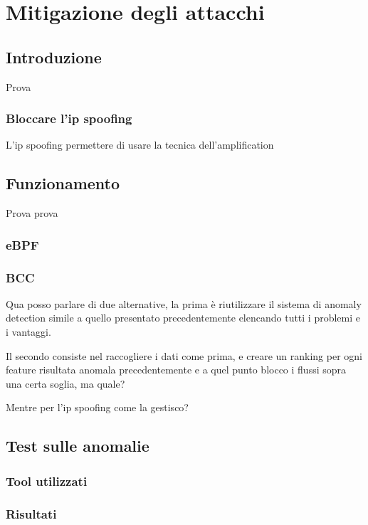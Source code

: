\chapter{Mitigazione degli attacchi}


\section{Introduzione}
Prova 
\subsection{Bloccare l'ip spoofing}
L'ip spoofing permettere di usare la tecnica dell'amplification


\section{Funzionamento}
Prova prova
\subsection{eBPF}
\subsection{BCC}

Qua posso parlare di due alternative, la prima è riutilizzare il sistema di anomaly detection simile a quello presentato precedentemente elencando tutti i problemi e i vantaggi.

Il secondo consiste nel raccogliere i dati come prima, e creare un ranking per ogni feature risultata anomala precedentemente e a quel punto blocco i flussi sopra una certa soglia, ma quale?

Mentre per l'ip spoofing come la gestisco?

\section{Test sulle anomalie}
\subsection{Tool utilizzati}
\subsection{Risultati}
